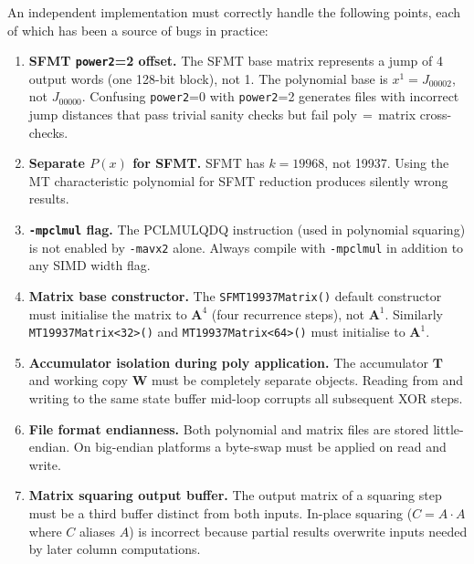 \documentclass{article}
\begin{document}
An independent implementation must correctly handle the following points, each of which
has been a source of bugs in practice:

\begin{enumerate}
  \item \textbf{SFMT \texttt{power2}=2 offset.}  The SFMT base matrix represents a jump
        of 4 output words (one 128-bit block), not 1.  The polynomial base is
        $x^1 = J_{00002}$, not $J_{00000}$.  Confusing \texttt{power2}=0 with
        \texttt{power2}=2 generates files with incorrect jump distances that pass
        trivial sanity checks but fail poly\,$=$\,matrix cross-checks.

  \item \textbf{Separate $P(x)$ for SFMT.}  SFMT has $k=19968$, not 19937.  Using the
        MT characteristic polynomial for SFMT reduction produces silently wrong results.

  \item \textbf{\texttt{-mpclmul} flag.}  The PCLMULQDQ instruction (used in polynomial
        squaring) is not enabled by \texttt{-mavx2} alone.  Always compile with
        \texttt{-mpclmul} in addition to any SIMD width flag.

  \item \textbf{Matrix base constructor.}  The \texttt{SFMT19937Matrix()} default
        constructor must initialise the matrix to $\mathbf{A}^4$ (four recurrence steps),
        not $\mathbf{A}^1$.  Similarly \texttt{MT19937Matrix<32>()} and
        \texttt{MT19937Matrix<64>()} must initialise to $\mathbf{A}^1$.

  \item \textbf{Accumulator isolation during poly application.}  The accumulator $\mathbf{T}$
        and working copy $\mathbf{W}$ must be completely separate objects.  Reading from
        and writing to the same state buffer mid-loop corrupts all subsequent XOR steps.

  \item \textbf{File format endianness.}  Both polynomial and matrix files are stored
        little-endian.  On big-endian platforms a byte-swap must be applied on read and
        write.

  \item \textbf{Matrix squaring output buffer.}  The output matrix of a squaring step must
        be a third buffer distinct from both inputs.  In-place squaring ($C = A \cdot A$
        where $C$ aliases $A$) is incorrect because partial results overwrite inputs needed
        by later column computations.
\end{enumerate}
\end{document}
